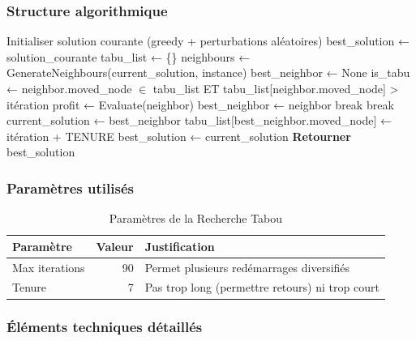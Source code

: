 \documentclass[11pt,a4paper]{article}
\begin{document}
\subsubsection*{Structure algorithmique}

\begin{algorithm}[H]
\caption{Recherche Tabou pour l'OP}
\begin{algorithmic}[1]
\State Initialiser solution courante (greedy + perturbations aléatoires)
\State best\_solution ← solution\_courante
\State tabu\_list ← \{\} 
    \State neighbours ← GenerateNeighbours(current\_solution, instance)
    \State best\_neighbor ← None
        \State is\_tabu ← neighbor.moved\_node $\in$ tabu\_list ET tabu\_list[neighbor.moved\_node] > itération
        \State profit ← Evaluate(neighbor)
            \State best\_neighbor ← neighbor 
            \State break
        \EndIf
    \EndFor
        \State break 
    \EndIf
    \State current\_solution ← best\_neighbor
    \State tabu\_list[best\_neighbor.moved\_node] ← itération + TENURE
        \State best\_solution ← current\_solution
    \EndIf
\EndFor
\State \textbf{Retourner} best\_solution
\end{algorithmic}
\end{algorithm}

\subsubsection*{Paramètres utilisés}

\begin{table}[H]
\centering
\caption{Paramètres de la Recherche Tabou}
\begin{tabular}{lrp{6cm}}
\toprule
\textbf{Paramètre} & \textbf{Valeur} & \textbf{Justification} \\
\midrule
Max iterations & 90 & Permet plusieurs redémarrages diversifiés \\
Tenure & 7 & Pas trop long (permettre retours) ni trop court \\
\bottomrule
\end{tabular}
\end{table}

\subsubsection*{Éléments techniques détaillés}
\end{document}
